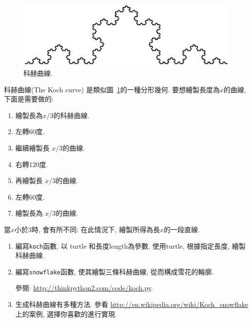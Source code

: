 \documentclass[10pt]{book}
\begin{document}
\begin{figure}
\centerline
{\includegraphics[scale=0.8]{figs/koch.pdf}}
\caption{科赫曲線.}
\label{fig.koch}
\end{figure}

\begin{exercise}

科赫曲線(The Koch curve) 是類似圖~\ref{fig.koch}的一種分形幾何. 
要想繪製長度為$x$的曲線, 下面是需要做的:

\begin{enumerate}

\item 繪製長為$x/3$的科赫曲線. 

\item 左轉60度. 

\item 繼續繪製長 $x/3$的曲線. 

\item 右轉120度. 

\item 再繪製長 $x/3$的曲線. 

\item 左轉60度. 

\item 繪製長為 $x/3$的曲線. 

\end{enumerate}

當$x$小於3時, 會有所不同:  在此情況下, 繪製所得為長$x$的一段直線. 

\begin{enumerate}

\item 編寫{\tt koch}函數, 以 turtle 和長度length為參數, 使用turtle, 根據指定長度, 繪製
科赫曲線. 

\item 編寫{\tt snowflake}函數, 使其繪製三條科赫曲線, 
從而構成雪花的輪廓.

參閱: \url{http://thinkpython2.com/code/koch.py}.

\item 生成科赫曲線有多種方法. 參看
\url{http://en.wikipedia.org/wiki/Koch_snowflake} 上的案例, 選擇你喜歡的進行實現. 


\end{enumerate}
\end{exercise}
\end{document}
